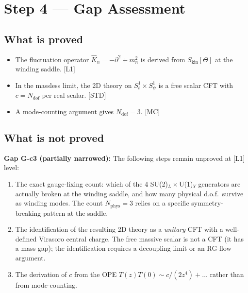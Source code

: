 \documentclass[12pt,a4paper]{article}
\theoremstyle{remark}
\begin{document}
\section{Step 4 — Gap Assessment}
\label{sec:gap}

\subsection{What is proved}

\begin{itemize}
  \item The fluctuation operator $\hat{K}_n = -\partial^2 + m_n^2$ is
        derived from $S_{\mathrm{kin}}[\Theta]$ at the winding saddle. [L1]
  \item In the massless limit, the 2D theory on $S^1_t\times S^1_\psi$
        is a free scalar CFT with $c = N_{\mathrm{dof}}$ per real scalar. [STD]
  \item A mode-counting argument gives $N_{\mathrm{dof}} = 3$. [MC]
\end{itemize}

\subsection{What is not proved}

\begin{gapbox}
\textbf{Gap G-c3 (partially narrowed):} The following steps remain unproved
at [L1] level:
\begin{enumerate}
  \item The exact gauge-fixing count: which of the 4 SU(2)$_L\times$U(1)$_Y$
        generators are actually broken at the winding saddle, and how many
        physical d.o.f.\ survive as winding modes.  The count $N_\mathrm{phys} = 3$
        relies on a specific symmetry-breaking pattern at the saddle.
  \item The identification of the resulting 2D theory as a \emph{unitary} CFT
        with a well-defined Virasoro central charge.  The free massive scalar
        is not a CFT (it has a mass gap); the identification requires a
        decoupling limit or an RG-flow argument.
  \item The derivation of $c$ from the OPE
        $T(z)T(0) \sim c/(2z^4) + \ldots$ rather than from mode-counting.
\end{enumerate}
\end{gapbox}
\end{document}
